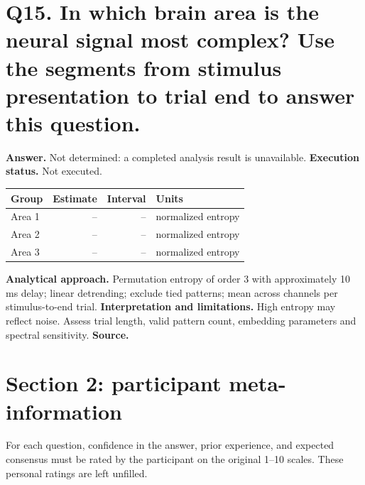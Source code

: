 \documentclass[11pt,a4paper]{article}
\begin{document}
\section*{Q15. In which brain area is the neural signal most complex? Use the segments from stimulus presentation to trial end to answer this question.}
\textbf{Answer.} Not determined: a completed analysis result is unavailable.
\textbf{Execution status.} Not executed.
\begin{tabularx}{\linewidth}{XrrX}\toprule Group & Estimate & Interval & Units \\\midrule
Area 1 & -- & -- & normalized entropy \\
Area 2 & -- & -- & normalized entropy \\
Area 3 & -- & -- & normalized entropy \\
\bottomrule\end{tabularx}
\textbf{Analytical approach.} Permutation entropy of order 3 with approximately 10 ms delay; linear detrending; exclude tied patterns; mean across channels per stimulus-to-end trial.
\textbf{Interpretation and limitations.} High entropy may reflect noise. Assess trial length, valid pattern count, embedding parameters and spectral sensitivity.
\textbf{Source.} 
\clearpage\section*{Section 2: participant meta-information}
For each question, confidence in the answer, prior experience, and expected consensus must be rated by the participant on the original 1--10 scales. These personal ratings are left unfilled.
\end{document}
